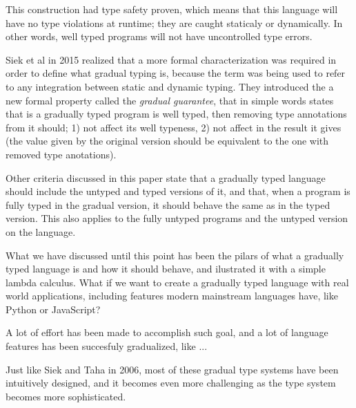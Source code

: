 \documentclass[submission]{eptcs}
\begin{document}
This construction had type safety proven, which means that this language will have no type violations at runtime; they are caught staticaly or dynamically.
In other words, well typed programs will not have uncontrolled type errors.

%

Siek et al in 2015 \cite{siek_et_al:LIPIcs.SNAPL.2015.274} realized that a more formal characterization was required in order to define what gradual typing is, because the term was being used to refer to any integration between static and dynamic typing.
They introduced the a new formal property called the \textit{gradual guarantee}, that in simple words states that is a gradually typed program is well typed, then removing type annotations from it should; 1) not affect its well typeness, 2) not affect in the result it gives (the value given by the original version should be equivalent to the one with removed type anotations).

Other criteria discussed in this paper state that a gradually typed language should include the untyped and typed versions of it, and that, when a program is fully typed in the gradual version, it should behave the same as in the typed version.
This also applies to the fully untyped programs and the untyped version on the language.


What we have discussed until this point has been the pilars of what a gradually typed language is and how it should behave, and ilustrated it with a simple lambda calculus.
What if we want to create a gradually typed language with real world applications, including features modern mainstream languages have, like Python or JavaScript?


A lot of effort has been made to accomplish such goal, and a lot of language features has been succesfuly gradualized, like ...

Just like Siek and Taha in 2006, most of these gradual type systems have been intuitively designed, and it becomes even more challenging as the type system becomes more sophisticated.
\end{document}
